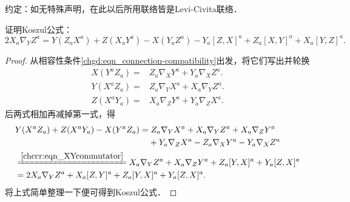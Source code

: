 
\begin{remark}
    约定：如无特殊声明，在此以后所用联络皆是Levi-Civita联络．
\end{remark}

\begin{example}\label{chrg:exam_Koszul}
    证明Koszul公式：
    \begin{equation*}
        2 X_a \nabla_Y Z^a = Y(Z_a X^a) + Z(X_a Y^a) - X(Y_a Z^a)
        - Y_a [Z,X]^a + Z_a [X,Y]^a + X_a [Y,Z]^a .
    \end{equation*}
\end{example}
\begin{proof}
    从相容性条件\eqref{chgd:eqn_connection-compatibility}出发，将它们写出并轮换
\begin{align*}
    X(Y^a Z_a)=& Z_a \nabla_{X}Y^a +Y_a\nabla_{X} Z^a.  \\
    Y(X^a Z_a)=& Z_a \nabla_{Y}X^a +X_a\nabla_{Y} Z^a.  \\
    Z(X^a Y_a)=& X_a \nabla_{Z}Y^a +Y_a\nabla_{Z} X^a.  
\end{align*}
    后两式相加再减掉第一式，得
    \begin{align*}
        &Y(X^a Z_a)+Z(X^a Y_a)-X(Y^a Z_a)= Z_a \nabla_{Y}X^a +X_a\nabla_{Y} Z^a
          +X_a \nabla_{Z}Y^a  \\
        &  \hphantom{Y(X^a Z_a)+Z(X^a Y_a)-X(Y^a Z_a)= }
          +Y_a\nabla_{Z} X^a-Z_a \nabla_{X}Y^a -Y_a\nabla_{X} Z^a \\
        &\xlongequal{\ref{chccr:eqn_XYcommutator}}  
         X_a\nabla_{Y} Z^a  +X_a \nabla_{Z}Y^a  +Z_a [Y,X]^a + Y_a [Z, X]^a \\
        &= 2X_a\nabla_{Y} Z^a  +X_a [Z,Y]^a  +Z_a [Y,X]^a + Y_a [Z, X]^a .
    \end{align*}
    将上式简单整理一下便可得到Koszul公式．
\end{proof}


